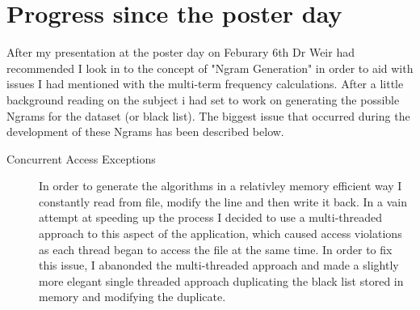 \documentclass{report}
\begin{document}
\section*{Progress since the poster day}
After my presentation at the poster day on Feburary 6th Dr Weir had recommended I look in to the concept of "Ngram Generation" in order to aid with issues I had mentioned with the multi-term frequency calculations. After a little background reading on the subject i had set to work on generating the possible Ngrams for the dataset (or black list). The biggest issue that occurred during the development of these Ngrams has been described below.
\begin{description}
\item[Concurrent Access Exceptions]
In order to generate the algorithms in a relativley memory efficient way I constantly read from file, modify the line and then write it back. In a vain attempt at speeding up the process I decided to use a multi-threaded approach to this aspect of the application, which caused access violations as each thread began to access the file at the same time. In order to fix this issue, I abanonded the multi-threaded approach and made a slightly more elegant single threaded approach duplicating the black list stored in memory and modifying the duplicate.
\end{description}
\end{document}
